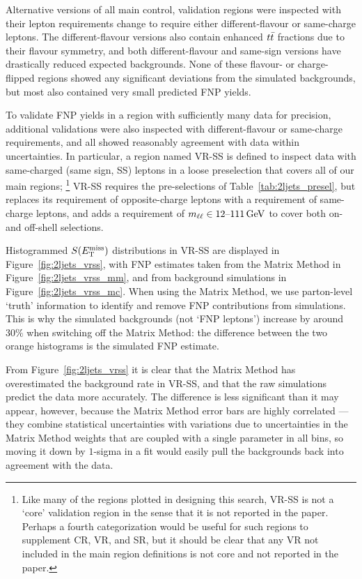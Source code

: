 Alternative versions of all main control, validation regions were inspected
with their lepton requirements change to require either different-flavour
or same-charge leptons.
The different-flavour versions also contain enhanced $\ttbar$ fractions
due to their flavour symmetry,
and both different-flavour and same-sign versions have drastically reduced
expected backgrounds.
None of these flavour- or charge- flipped regions showed any significant
deviations from the simulated backgrounds, but most also contained very small
predicted FNP yields.

To validate FNP yields in a region with sufficiently many data for precision,
additional validations were also inspected with different-flavour or
same-charge requirements, and all showed reasonably agreement with data
within uncertainties.
In particular, a region named VR-SS is defined to inspect data with
same-charged (same sign, SS) leptons in a loose preselection that covers all
of our main regions;%
\footnote{%
Like many of the regions plotted in designing this search, VR-SS is not a
`core' validation region in the sense that it is not reported in the paper.
Perhaps a fourth categorization would be useful for such regions to supplement
CR, VR, and SR, but it should be clear that any VR not included in the main
region definitions is not core and not reported in the paper.
}
VR-SS requires the pre-selections of Table~\ref{tab:2ljets_presel},
but replaces its requirement of opposite-charge leptons with a requirement of
same-charge leptons, and adds a requirement of $\mll \in 12\textrm{--}111\,\eV[G]$
to cover both on- and off-shell selections.

Histogrammed $\metsig$ distributions in VR-SS are displayed in
Figure~\ref{fig:2ljets_vrss},
with FNP estimates taken from the Matrix Method in
Figure~\ref{fig:2ljets_vrss_mm},
and from background simulations in
Figure~\ref{fig:2ljets_vrss_mc}.
When using the Matrix Method, we use parton-level `truth' information to
identify and remove FNP contributions from simulations.
This is why the simulated backgrounds (not `FNP leptons') increase by around
$30\%$ when switching off the Matrix Method: the difference between the
two orange histograms is the simulated FNP estimate.

From Figure~\ref{fig:2ljets_vrss} it is clear that the Matrix Method has
overestimated the background rate in VR-SS, and that the raw simulations
predict the data more accurately.
The difference is less significant than it may appear, however,
because the Matrix Method error bars are highly correlated --- they combine
statistical uncertainties with variations due to uncertainties in the
Matrix Method weights that are coupled with a single parameter in all bins,
so moving it down by $1$-sigma in a fit would easily pull the backgrounds back
into agreement with the data.

